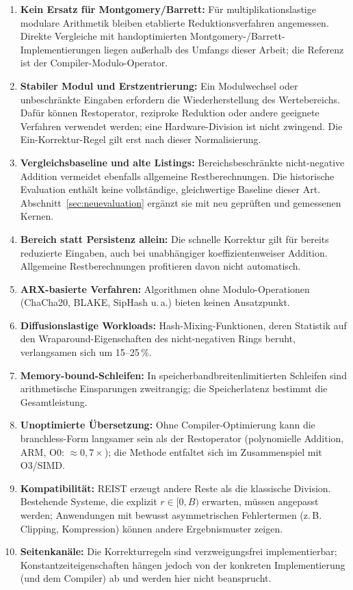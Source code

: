 \documentclass[11pt,a4paper]{scrartcl}
\theoremstyle{definition}
\theoremstyle{plain}
\theoremstyle{remark}
\begin{document}
\begin{enumerate}
\item \textbf{Kein Ersatz für Montgomery/Barrett:} Für multiplikationslastige modulare Arithmetik bleiben etablierte Reduktionsverfahren angemessen. Direkte Vergleiche mit handoptimierten Montgomery-/Barrett-Implementierungen liegen außerhalb des Umfangs dieser Arbeit; die Referenz ist der Compiler-Modulo-Operator.
\item \textbf{Stabiler Modul und Erstzentrierung:} Ein Modulwechsel oder unbeschränkte Eingaben erfordern die Wiederherstellung des Wertebereichs. Dafür können Restoperator, reziproke Reduktion oder andere geeignete Verfahren verwendet werden; eine Hardware-Division ist nicht zwingend. Die Ein-Korrektur-Regel gilt erst nach dieser Normalisierung.
\item \textbf{Vergleichsbaseline und alte Listings:} Bereichsbeschränkte nicht-negative Addition vermeidet ebenfalls allgemeine Restberechnungen. Die historische Evaluation enthält keine vollständige, gleichwertige Baseline dieser Art. Abschnitt~\ref{sec:neuevaluation} ergänzt sie mit neu geprüften und gemessenen Kernen.
\item \textbf{Bereich statt Persistenz allein:} Die schnelle Korrektur gilt für bereits reduzierte Eingaben, auch bei unabhängiger koeffizientenweiser Addition. Allgemeine Restberechnungen profitieren davon nicht automatisch.

\item \textbf{ARX-basierte Verfahren:} Algorithmen ohne Modulo-Operationen (ChaCha20, BLAKE, SipHash u.\,a.) bieten keinen Ansatzpunkt.
\item \textbf{Diffusionslastige Workloads:} Hash-Mixing-Funktionen, deren Statistik auf den Wraparound-Eigenschaften des nicht-negativen Rings beruht, verlangsamen sich um 15--25\,\%.
\item \textbf{Memory-bound-Schleifen:} In speicherbandbreitenlimitierten Schleifen sind arithmetische Einsparungen zweitrangig; die Speicherlatenz bestimmt die Gesamtleistung.
\item \textbf{Unoptimierte Übersetzung:} Ohne Compiler-Optimierung kann die branchless-Form langsamer sein als der Restoperator (polynomielle Addition, ARM, O0: $\approx 0{,}7\times$); die Methode entfaltet sich im Zusammenspiel mit O3/SIMD.
\item \textbf{Kompatibilität:} REIST erzeugt andere Reste als die klassische Division. Bestehende Systeme, die explizit $r \in [0, B)$ erwarten, müssen angepasst werden; Anwendungen mit bewusst asymmetrischen Fehlertermen (z.\,B. Clipping, Kompression) können andere Ergebnismuster zeigen.
\item \textbf{Seitenkanäle:} Die Korrekturregeln sind verzweigungsfrei implementierbar; Konstantzeiteigenschaften hängen jedoch von der konkreten Implementierung (und dem Compiler) ab und werden hier nicht beansprucht.
\end{enumerate}
\end{document}

